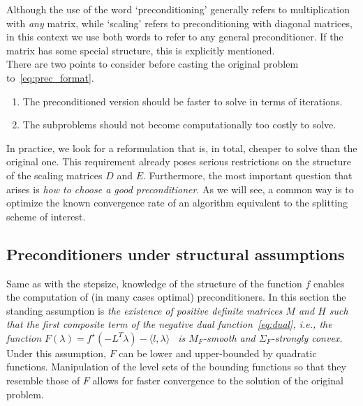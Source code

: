 \documentclass[openany]{now}
\newcommand{\ie}{{\it i.e.}}
\begin{document}
\remark Although the use of the word `preconditioning' generally refers to multiplication with \emph{any} matrix, while `scaling' refers to preconditioning with diagonal matrices, in this context we use both words to refer to any general preconditioner. If the matrix has some special structure, this is explicitly mentioned.\\

There are two points to consider before casting the original problem to~\eqref{eq:prec_format}.
\begin{enumerate}
\item The preconditioned version should be faster to solve in terms of iterations.
\item The subproblems should not become computationally too costly to solve.
\end{enumerate}
In practice, we look for a reformulation that is, in total, cheaper to solve than the original one. This requirement already poses serious restrictions on the structure of the scaling matrices $D$ and $E$. Furthermore, the most important question that arises is \emph{how to choose a good preconditioner}. As we will see, a common way is to optimize the known convergence rate of an algorithm equivalent to the splitting scheme of interest.

\subsection{Preconditioners under structural assumptions}
Same as with the stepsize, knowledge of the structure of the function $f$ enables the computation of (in many cases optimal) preconditioners. In this section the standing assumption is \emph{the existence of positive definite matrices $M$ and $H$ such that the first composite term of the negative dual function~\eqref{eq:dual}, \ie, the function $F(\lambda)=f^\star(-L^T\lambda) - \langle  l,\lambda\rangle \enspace$ is $M_F$-smooth and $\Sigma_F$-strongly convex.} Under this assumption, $F$ can be lower and upper-bounded by quadratic functions. Manipulation of the level sets of the bounding functions so that they resemble those of $F$ allows for faster convergence to the solution of the original problem.  
\end{document}
